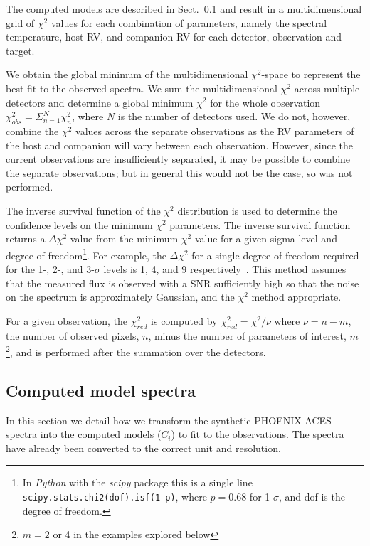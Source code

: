 The computed models are described in Sect.~\ref{models} and result in a multidimensional grid of \(\chi^2\) values for each combination of parameters, namely the spectral temperature, host RV, and companion RV for each detector, observation and target.

We obtain the global minimum of the multidimensional \(\chi^{2}\)-space to represent the best fit to the observed spectra. We sum the multidimensional \(\chi^{2} \) across multiple detectors and determine a global minimum \(\chi^{2} \) for the whole observation \(\chi^{2}_{obs} = \Sigma^{N}_{n=1} \chi^{2}_n \), where \(N\) is the number of detectors used. We do not, however, combine the \(\chi^{2} \) values across the separate observations as the RV parameters of the host and companion will vary between each observation. However, since the current observations are insufficiently separated, it may be possible to combine the separate observations; but in general this would not be the case, so was not performed.

The inverse survival function of the \(\chi^2\) distribution is used to determine the confidence levels on the minimum \(\chi^2\) parameters. The inverse survival function returns a \(\Delta\chi^2\) value from the minimum \(\chi^2\) value for a given sigma level and degree of freedom\footnote{In \emph{Python} with the \emph{scipy} package this is a single line \texttt{scipy.stats.chi2(dof).isf(1-p)}, where \(p = 0.68\) for 1-\(\sigma\), and dof is the degree of freedom.}. 
For example, the \(\Delta \chi^2\) for a single degree of freedom required for the 1-, 2-, and 3-\(\sigma\) levels is 1, 4, and 9 respectively~\citep{bevington_data_2003}. This method assumes that the measured flux is observed with a SNR sufficiently high so that the noise on the spectrum is approximately Gaussian, and the \(\chi^2\) method appropriate.

For a given observation, the \(\chi^{2}_{red}\) is computed by \(\chi^2_{red} = \chi^2 / \nu \) where \(\nu = n - m\), the number of observed pixels, \(n\), minus the number of parameters of interest, \(m\)\footnote{\(m=2\) or 4 in the examples explored below}, and is performed after the summation over the detectors.




\subsection{Computed model spectra}
\label{models}
In this section we detail how we transform the synthetic PHOENIX-ACES spectra into the computed models (\(C_i\)) to fit to the observations. The spectra have already been converted to the correct unit and resolution.

